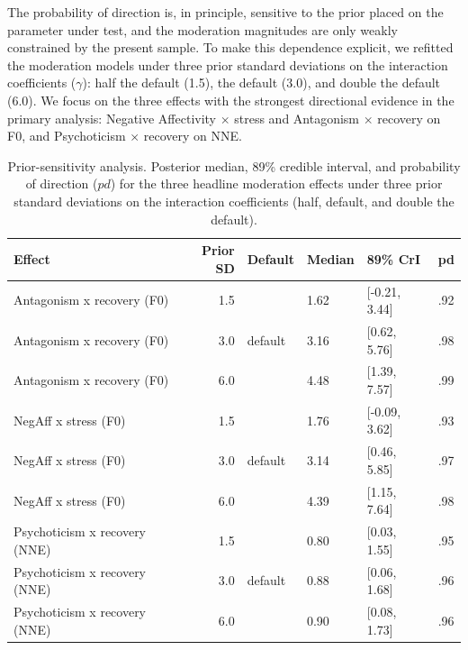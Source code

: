 \documentclass[
  english,
  man,floatsintext]{apa6}
\begin{document}
The probability of direction is, in principle, sensitive to the prior placed on the
parameter under test, and the moderation magnitudes are only weakly constrained by the
present sample. To make this dependence explicit, we refitted the moderation models under
three prior standard deviations on the interaction coefficients (\(\gamma\)): half the
default (1.5), the default (3.0), and double the default (6.0). We focus on the three
effects with the strongest directional evidence in the primary analysis: Negative
Affectivity \(\times\) stress and Antagonism \(\times\) recovery on F0, and
Psychoticism \(\times\) recovery on NNE.

\begin{table}[H]
\centering
\caption{\label{tab:table-prior-sensitivity}Prior-sensitivity analysis. Posterior median, 89\% credible interval, and probability of direction ($pd$) for the three headline moderation effects under three prior standard deviations on the interaction coefficients (half, default, and double the default).}
\centering
\fontsize{9}{11}\selectfont
\begin{tabular}[t]{lrllll}
\toprule
Effect & Prior SD & Default & Median & 89\% CrI & pd\\
\midrule
Antagonism x recovery (F0) & 1.5 &  & 1.62 & {}[-0.21, 3.44] & .92\\
Antagonism x recovery (F0) & 3.0 & default & 3.16 & {}[0.62, 5.76] & .98\\
Antagonism x recovery (F0) & 6.0 &  & 4.48 & {}[1.39, 7.57] & .99\\
NegAff x stress (F0) & 1.5 &  & 1.76 & {}[-0.09, 3.62] & .93\\
NegAff x stress (F0) & 3.0 & default & 3.14 & {}[0.46, 5.85] & .97\\
\addlinespace
NegAff x stress (F0) & 6.0 &  & 4.39 & {}[1.15, 7.64] & .98\\
Psychoticism x recovery (NNE) & 1.5 &  & 0.80 & {}[0.03, 1.55] & .95\\
Psychoticism x recovery (NNE) & 3.0 & default & 0.88 & {}[0.06, 1.68] & .96\\
Psychoticism x recovery (NNE) & 6.0 &  & 0.90 & {}[0.08, 1.73] & .96\\
\bottomrule
\end{tabular}
\end{table}
\end{document}
